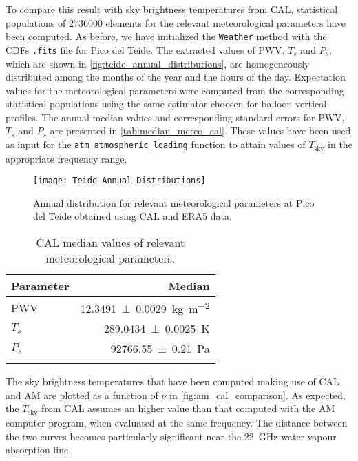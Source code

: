 To compare this result with sky brightness temperatures from CAL,
statistical populations of \num{2736000} elements for the relevant
meteorological parameters have been computed. As before, we have
initialized the \texttt{Weather} method with the CDFs \texttt{.fits} file
for Pico del Teide. The extracted values of PWV, $T_s$ and $P_s$, which are
shown in \autoref{fig:teide_annual_distributions}, are homogeneously
distributed among the months of the year and the hours of the day.
Expectation values for the meteorological parameters were computed from the
corresponding statistical populations using the same estimator choosen for
balloon vertical profiles. The annual median values and corresponding
standard errors for PWV, $T_s$ and $P_s$ are presented in
\autoref{tab:median_meteo_cal}.  These values have been used as input for
the \texttt{atm\_atmospheric\_loading} function to attain values of $T_\text{sky}$
in the appropriate frequency range.

\begin{figure}
        \centering
        \texttt{[image: Teide\_Annual\_Distributions]}
        \caption{Annual distribution for relevant meteorological parameters
        at Pico del Teide obtained using CAL and ERA5 data.}
        \label{fig:teide_annual_distributions}
\end{figure}

\begin{table}
        \renewcommand{\arraystretch}{1.5}
        \centering
        \begin{tabular}{p{5cm} r}
                \hline
                Parameter & Median  \\
                \hline
                \hline
                PWV \dotfill & \SI{12.3491 \pm 0.0029}{\kilo\gram\per\square\meter} \\
                $T_s$ \dotfill& \SI{289.0434 \pm 0.0025}{\kelvin} \\
                $P_s$ \dotfill &  \SI{92766.55 \pm 0.21}{\pascal} \\
                \noalign{\smallskip}
                \hline
        \end{tabular}
        \caption{CAL median values of relevant meteorological parameters.}
        \label{tab:median_meteo_cal}
\end{table}

The sky brightness temperatures that have been computed making use of CAL
and AM are plotted as a function of $\nu$ in
\autoref{fig:am_cal_comparison}. As expected, the $T_\text{sky}$
from CAL assumes an higher value than that computed with the AM computer
program, when evaluated at the same
frequency. The distance between the two curves becomes particularly
significant near the \SI{22}{\giga\hertz} water vapour absorption line.

